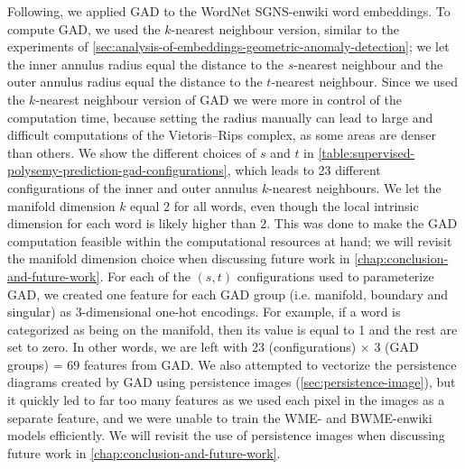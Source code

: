 Following, we applied GAD to the WordNet SGNS-enwiki word embeddings. To compute GAD, we used the $k$-nearest neighbour version, similar to the experiments of \cref{sec:analysis-of-embeddings-geometric-anomaly-detection}; we let the inner annulus radius equal the distance to the $s$-nearest neighbour and the outer annulus radius equal the distance to the $t$-nearest neighbour. Since we used the $k$-nearest neighbour version of GAD we were more in control of the computation time, because setting the radius manually can lead to large and difficult computations of the Vietoris–Rips complex, as some areas are denser than others. We show the different choices of $s$ and $t$ in \cref{table:supervised-polysemy-prediction-gad-configurations}, which leads to 23 different configurations of the inner and outer annulus $k$-nearest neighbours. We let the manifold dimension $k$ equal 2 for all words, even though the local intrinsic dimension for each word is likely higher than 2. This was done to make the GAD computation feasible within the computational resources at hand; we will revisit the manifold dimension choice when discussing future work in \cref{chap:conclusion-and-future-work}. For each of the $(s, t)$ configurations used to parameterize GAD, we created one feature for each GAD group (i.e. manifold, boundary and singular) as 3-dimensional one-hot encodings. For example, if a word is categorized as being on the manifold, then its value is equal to 1 and the rest are set to zero. In other words, we are left with 23 (configurations) $\times$ 3 (GAD groups) = 69 features from GAD. We also attempted to vectorize the persistence diagrams created by GAD using persistence images (\cref{sec:persistence-image}), but it quickly led to far too many features as we used each pixel in the images as a separate feature, and we were unable to train the WME- and BWME-enwiki models efficiently. We will revisit the use of persistence images when discussing future work in \cref{chap:conclusion-and-future-work}.
